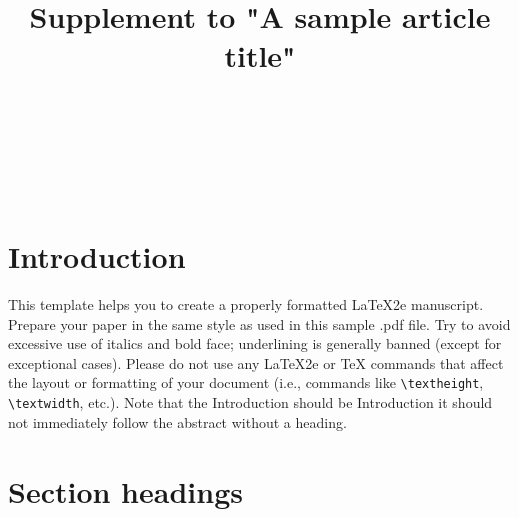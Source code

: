 \documentclass[qe,nameyear,final,supplement,openaccess]{econsocart}
\theoremstyle{plain}
\begin{document}
\begin{frontmatter}

\title{Supplement to "A sample article title"}

\begin{aug}
%
%
%
\author[add1,add11]{~}
\author[add2]{~}
\author[add2]{~}
\address[add1]{%
,
}

\address[add11]{%
,
}

\address[add2]{%
,
}

\end{aug}




\end{frontmatter}

\section{Introduction}\label{s1}

This template helps you to create a properly formatted LaTeX2e manuscript.
Prepare your paper in the same style as used in this sample .pdf file.
Try to avoid excessive use of italics and bold face; underlining is generally banned (except for exceptional cases). Please do not use any LaTeX2e or TeX commands that affect the layout or formatting of your document (i.e., commands like \texttt{{\textbackslash}textheight}, \texttt{{\textbackslash}textwidth}, etc.). Note that the Introduction should be Introduction it should not immediately follow the abstract without a heading.

\section{Section headings}
\end{document}
